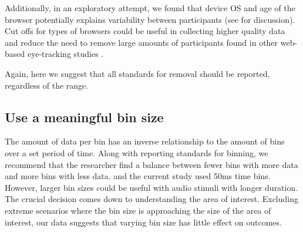 Additionally, in an exploratory attempt, we found that device OS and age of the browser potentially explains variability between participants (see \parencite{Rodd_2024-in_press} for discussion). Cut offs for types of browsers could be useful in collecting higher quality data and reduce the need to remove large amounts of participants found in other web-based eye-tracking studies \parencite{Prystauka_Altmann_Rothman_2023}.

Again, here we suggest that all standards for removal should be reported, regardless of the range.

\subsection{Use a meaningful bin size}
The amount of data per bin has an inverse relationship to the amount of bins over a set period of time. Along with reporting standards for binning, we recommend that the researcher find a balance between fewer bins with more data and more bins with less data. \textcite{Vos_2017} and the current study used 50ms time bins. However, larger bin sizes could be useful with audio stimuli with longer duration. The crucial decision comes down to understanding the area of interest. Excluding extreme scenarios where the bin size is approaching the size of the area of interest, our data suggests that varying bin size has little effect on outcomes. 



